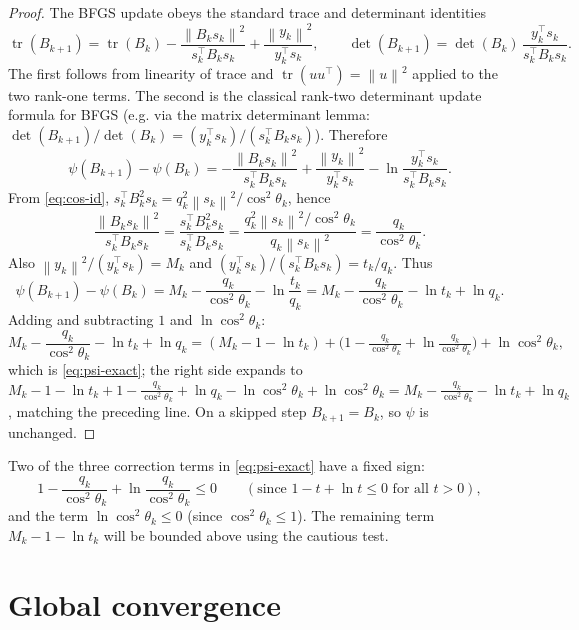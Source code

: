 \documentclass{amsart}
\theoremstyle{definition}
\DeclareMathOperator{\tr}{tr}
\newcommand{\norm}[1]{\left\lVert #1\right\rVert}
\begin{document}
\begin{proof}
The BFGS update obeys the standard trace and determinant identities
\begin{equation}\label{eq:tr-det}
   \tr(B_{k+1})=\tr(B_k)-\frac{\norm{B_k s_k}^2}{s_k^\top B_k s_k}
                          +\frac{\norm{y_k}^2}{y_k^\top s_k},
   \qquad
   \det(B_{k+1})=\det(B_k)\,\frac{y_k^\top s_k}{s_k^\top B_k s_k}.
\end{equation}
The first follows from linearity of trace and $\tr(uu^\top)=\norm{u}^2$ applied
to the two rank-one terms. The second is the classical rank-two determinant
update formula for BFGS (e.g. via the matrix determinant lemma:
$\det(B_{k+1})/\det(B_k)=(y_k^\top s_k)/(s_k^\top B_k s_k)$). Therefore
\[
   \psi(B_{k+1})-\psi(B_k)
   =-\frac{\norm{B_k s_k}^2}{s_k^\top B_k s_k}+\frac{\norm{y_k}^2}{y_k^\top s_k}
   -\ln\frac{y_k^\top s_k}{s_k^\top B_k s_k}.
\]
From \eqref{eq:cos-id}, $s_k^\top B_k^2 s_k=q_k^2\norm{s_k}^2/\cos^2\theta_k$,
hence
\[
   \frac{\norm{B_k s_k}^2}{s_k^\top B_k s_k}
   =\frac{s_k^\top B_k^2 s_k}{s_k^\top B_k s_k}
   =\frac{q_k^2\norm{s_k}^2/\cos^2\theta_k}{q_k\norm{s_k}^2}
   =\frac{q_k}{\cos^2\theta_k}.
\]
Also $\norm{y_k}^2/(y_k^\top s_k)=M_k$ and
$(y_k^\top s_k)/(s_k^\top B_k s_k)=t_k/q_k$. Thus
\[
   \psi(B_{k+1})-\psi(B_k)
   =M_k-\frac{q_k}{\cos^2\theta_k}-\ln\frac{t_k}{q_k}
   =M_k-\frac{q_k}{\cos^2\theta_k}-\ln t_k+\ln q_k .
\]
Adding and subtracting $1$ and $\ln\cos^2\theta_k$:
\[
   M_k-\frac{q_k}{\cos^2\theta_k}-\ln t_k+\ln q_k
   =(M_k-1-\ln t_k)
    +\Big(1-\tfrac{q_k}{\cos^2\theta_k}+\ln\tfrac{q_k}{\cos^2\theta_k}\Big)
    +\ln\cos^2\theta_k,
\]
which is \eqref{eq:psi-exact}; the right side expands to
$M_k-1-\ln t_k+1-\tfrac{q_k}{\cos^2\theta_k}+\ln q_k-\ln\cos^2\theta_k
+\ln\cos^2\theta_k=M_k-\tfrac{q_k}{\cos^2\theta_k}-\ln t_k+\ln q_k$, matching the
preceding line. On a skipped step $B_{k+1}=B_k$, so $\psi$ is unchanged.
\end{proof}

Two of the three correction terms in \eqref{eq:psi-exact} have a fixed sign:
\begin{equation}\label{eq:term2}
   1-\frac{q_k}{\cos^2\theta_k}+\ln\frac{q_k}{\cos^2\theta_k}\le0
   \qquad(\text{since }1-t+\ln t\le0\text{ for all }t>0),
\end{equation}
and the term $\ln\cos^2\theta_k\le0$ (since $\cos^2\theta_k\le1$). The remaining
term $M_k-1-\ln t_k$ will be bounded above using the cautious test.

\section{Global convergence}
\end{document}
